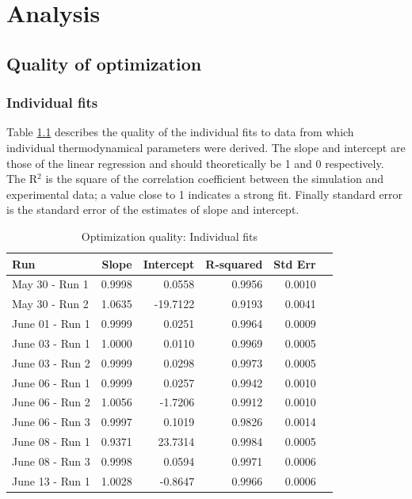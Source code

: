 \documentclass[letterpaper,titlepage,oneside]{report}
\begin{document}
\chapter{Analysis}
\label{ch:analysis}

\section{Quality of optimization}

\subsection*{Individual fits}
Table \ref{tab:optindividual} describes the quality of the individual fits to
data from which individual thermodynamical parameters were derived.
The slope and intercept are those of the linear regression and should
theoretically be 1 and 0 respectively. The R$^2$ is the square of the
correlation coefficient between the simulation and experimental data; a value
close to 1 indicates a strong fit. Finally standard error is the standard
error of the estimates of slope and intercept.

\begin{table}[ht]
  \caption{Optimization quality: Individual fits}
  \label{tab:optindividual}
  \centering
  \begin{tabularx}{0.75\textwidth}{|X|r|r|r|r|r|}
    \hline
    Run & Slope & Intercept & R-squared & Std Err \\
    \hline
    May  30 - Run 1   &   0.9998   &   0.0558   &    0.9956   &   0.0010 \\
    May  30 - Run 2   &   1.0635   & -19.7122   &    0.9193   &   0.0041 \\
    June 01 - Run 1   &   0.9999   &   0.0251   &    0.9964   &   0.0009 \\
    June 03 - Run 1   &   1.0000   &   0.0110   &    0.9969   &   0.0005 \\
    June 03 - Run 2   &   0.9999   &   0.0298   &    0.9973   &   0.0005 \\
    June 06 - Run 1   &   0.9999   &   0.0257   &    0.9942   &   0.0010 \\
    June 06 - Run 2   &   1.0056   &  -1.7206   &    0.9912   &   0.0010 \\
    June 06 - Run 3   &   0.9997   &   0.1019   &    0.9826   &   0.0014 \\
    June 08 - Run 1   &   0.9371   &  23.7314   &    0.9984   &   0.0005 \\
    June 08 - Run 3   &   0.9998   &   0.0594   &    0.9971   &   0.0006 \\
    June 13 - Run 1   &   1.0028   &  -0.8647   &    0.9966   &   0.0006 \\
    \hline
  \end{tabularx}
\end{table}
\end{document}
